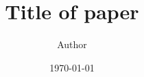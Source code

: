 \documentclass[12pt, reqno]{amsart}
\title{Title of paper}
\author{Author}
\date{\today}
\begin{document}
\begin{abstract}

\end{abstract}
\maketitle

\printbibliography
\end{document}
